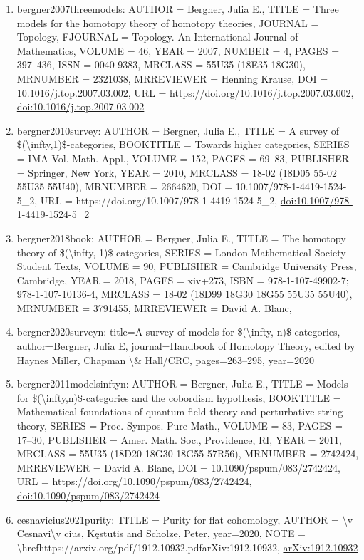 \documentclass[11pt]{article}
\begin{document}
\begin{enumerate}[leftmargin=*]
  \item bergner2007threemodels: AUTHOR = Bergner, Julia E., TITLE = Three models for the homotopy theory of homotopy theories, JOURNAL = Topology, FJOURNAL = Topology. An International Journal of Mathematics, VOLUME = 46, YEAR = 2007, NUMBER = 4, PAGES = 397--436, ISSN = 0040-9383, MRCLASS = 55U35 (18E35 18G30), MRNUMBER = 2321038, MRREVIEWER = Henning Krause, DOI = 10.1016/j.top.2007.03.002, URL = https://doi.org/10.1016/j.top.2007.03.002, \href{https://doi.org/10.1016/j.top.2007.03.002}{doi:10.1016/j.top.2007.03.002}
  \item bergner2010survey: AUTHOR = Bergner, Julia E., TITLE = A survey of \$(\textbackslash{}infty,1)\$-categories, BOOKTITLE = Towards higher categories, SERIES = IMA Vol. Math. Appl., VOLUME = 152, PAGES = 69--83, PUBLISHER = Springer, New York, YEAR = 2010, MRCLASS = 18-02 (18D05 55-02 55U35 55U40), MRNUMBER = 2664620, DOI = 10.1007/978-1-4419-1524-5\_2, URL = https://doi.org/10.1007/978-1-4419-1524-5\_2, \href{https://doi.org/10.1007/978-1-4419-1524-5\_2}{doi:10.1007/978-1-4419-1524-5\_2}
  \item bergner2018book: AUTHOR = Bergner, Julia E., TITLE = The homotopy theory of \$(\textbackslash{}infty, 1)\$-categories, SERIES = London Mathematical Society Student Texts, VOLUME = 90, PUBLISHER = Cambridge University Press, Cambridge, YEAR = 2018, PAGES = xiv+273, ISBN = 978-1-107-49902-7; 978-1-107-10136-4, MRCLASS = 18-02 (18D99 18G30 18G55 55U35 55U40), MRNUMBER = 3791455, MRREVIEWER = David A. Blanc,
  \item bergner2020surveyn: title=A survey of models for \$(\textbackslash{}infty, n)\$-categories, author=Bergner, Julia E, journal=Handbook of Homotopy Theory, edited by Haynes Miller, Chapman \textbackslash{}\& Hall/CRC, pages=263--295, year=2020
  \item bergner2011modelsinftyn: AUTHOR = Bergner, Julia E., TITLE = Models for \$(\textbackslash{}infty,n)\$-categories and the cobordism hypothesis, BOOKTITLE = Mathematical foundations of quantum field theory and perturbative string theory, SERIES = Proc. Sympos. Pure Math., VOLUME = 83, PAGES = 17--30, PUBLISHER = Amer. Math. Soc., Providence, RI, YEAR = 2011, MRCLASS = 55U35 (18D20 18G30 18G55 57R56), MRNUMBER = 2742424, MRREVIEWER = David A. Blanc, DOI = 10.1090/pspum/083/2742424, URL = https://doi.org/10.1090/pspum/083/2742424, \href{https://doi.org/10.1090/pspum/083/2742424}{doi:10.1090/pspum/083/2742424}
  \item cesnavicius2021purity: TITLE = Purity for flat cohomology, AUTHOR = \textbackslash{}v Cesnavi\textbackslash{}v cius, Kęstutis and Scholze, Peter, year=2020, NOTE = \textbackslash{}hrefhttps://arxiv.org/pdf/1912.10932.pdfarXiv:1912.10932, \href{https://arxiv.org/abs/1912.10932}{arXiv:1912.10932}

\end{enumerate}
\end{document}
